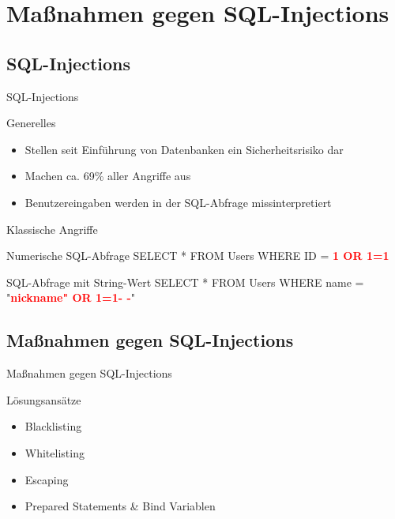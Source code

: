 \section{Maßnahmen gegen SQL-Injections}

\subsection{SQL-Injections}
\begin{frame}{SQL-Injections}
\begin{block}{Generelles}
\begin{itemize}
	\item Stellen seit Einführung von Datenbanken ein Sicherheitsrisiko dar
	\item Machen ca. 69\% aller Angriffe aus \footnotemark
	\item Benutzereingaben werden in der SQL-Abfrage missinterpretiert
\end{itemize}
\end{block}
\end{frame}

\begin{frame}{Klassische Angriffe}
\begin{block}{Numerische SQL-Abfrage}
	SELECT * FROM Users WHERE ID = \textcolor{red}{\textbf{1 OR 1=1}}
\end{block}
\begin{block}{SQL-Abfrage mit String-Wert}
	SELECT * FROM Users WHERE name = "{}\textcolor{red}{\textbf{nickname"{} OR 1=1- -}}"{}
\end{block}
\end{frame}


\subsection{Maßnahmen gegen SQL-Injections}
\begin{frame}{Maßnahmen gegen SQL-Injections}
\begin{block}{Lösungsansätze}
\begin{itemize}
\item Blacklisting 
\item Whitelisting
\item Escaping
\item Prepared Statements \& Bind Variablen
\end{itemize}
\end{block}
\end{frame}

